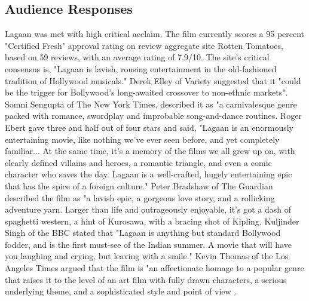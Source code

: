 \documentclass[a4paper]{article}
\begin{document}
	\subsection{Audience Responses}	            
	Lagaan was met with high critical acclaim. The film currently scores a 95 percent "Certified Fresh" approval rating on review aggregate site Rotten Tomatoes, based on 59 reviews, with an average rating of 7.9/10. The site's critical consensus is, "Lagaan is lavish, rousing entertainment in the old-fashioned tradition of Hollywood musicals." Derek Elley of Variety suggested that it "could be the trigger for Bollywood's long-awaited crossover to non-ethnic markets". Somni Sengupta of The New York Times, described it as "a carnivalesque genre packed with romance, swordplay and improbable song-and-dance routines. Roger Ebert gave three and half out of four stars and said, "Lagaan is an enormously entertaining movie, like nothing we've ever seen before, and yet completely familiar... At the same time, it's a memory of the films we all grew up on, with clearly defined villains and heroes, a romantic triangle, and even a comic character who saves the day. Lagaan is a well-crafted, hugely entertaining epic that has the spice of a foreign culture." Peter Bradshaw of The Guardian described the film as "a lavish epic, a gorgeous love story, and a rollicking adventure yarn. Larger than life and outrageously enjoyable, it's got a dash of spaghetti western, a hint of Kurosawa, with a bracing shot of Kipling. Kuljinder Singh of the BBC stated that "Lagaan is anything but standard Bollywood fodder, and is the first must-see of the Indian summer. A movie that will have you laughing and crying, but leaving with a smile." Kevin Thomas of the Los Angeles Times argued that the film is "an affectionate homage to a popular genre that raises it to the level of an art film with fully drawn characters, a serious underlying theme, and a sophisticated style and point of view .       
	     
	    
	

	  


	    	   
	

	
	
\end{document}
